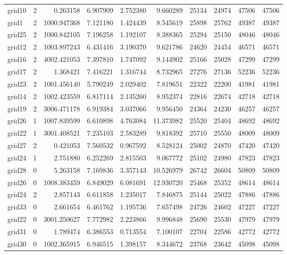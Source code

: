 \begin{longtable}{|l|r|r|r|r|r|r|r|r|r|}
grid10 & 2 & 0.263158 & 6.907909 & 2.752380 & 9.660289 & 25134 & 24974 & 47506 & 47506 \\
grid1 & 2 & 1000.947368 & 7.121180 & 1.424439 & 8.545619 & 25898 & 25762 & 49387 & 49387 \\
grid25 & 2 & 1000.842105 & 7.196258 & 1.192107 & 8.388365 & 25294 & 25150 & 48046 & 48046 \\
grid12 & 2 & 1003.897243 & 6.431416 & 3.190370 & 9.621786 & 24620 & 24454 & 46571 & 46571 \\
grid16 & 2 & 4002.421053 & 7.397810 & 1.747092 & 9.144902 & 25166 & 25028 & 47299 & 47299 \\
grid17 & 2 & 1.368421 & 7.416221 & 1.316744 & 8.732965 & 27276 & 27136 & 52236 & 52236 \\
grid23 & 2 & 1001.456140 & 5.790249 & 2.029402 & 7.819651 & 22322 & 22200 & 41981 & 41981 \\
grid14 & 2 & 1002.423559 & 6.817114 & 2.135260 & 8.952374 & 22816 & 22674 & 42718 & 42718 \\
grid19 & 2 & 3006.471178 & 6.919384 & 3.037066 & 9.956450 & 24364 & 24230 & 46257 & 46257 \\
grid26 & 1 & 1007.839599 & 6.610898 & 4.763084 & 11.373982 & 25520 & 25404 & 48692 & 48692 \\
grid22 & 1 & 3001.408521 & 7.235103 & 2.583289 & 9.818392 & 25710 & 25550 & 48009 & 48009 \\
grid27 & 2 & 0.421053 & 7.560532 & 0.967592 & 8.528124 & 25002 & 24870 & 47420 & 47420 \\
grid24 & 1 & 2.751880 & 6.252269 & 2.815503 & 9.067772 & 25102 & 24980 & 47823 & 47823 \\
grid28 & 0 & 5.263158 & 7.169836 & 3.357143 & 10.526979 & 26742 & 26604 & 50809 & 50809 \\
grid26 & 0 & 1008.383459 & 6.849029 & 6.081691 & 12.930720 & 25468 & 25352 & 48614 & 48614 \\
grid24 & 2 & 2.857143 & 6.611858 & 1.235017 & 7.846875 & 25144 & 25022 & 47886 & 47886 \\
grid33 & 0 & 2.661654 & 6.461762 & 1.195736 & 7.657498 & 24726 & 24602 & 47227 & 47227 \\
grid22 & 0 & 3001.250627 & 7.772982 & 2.223866 & 9.996848 & 25690 & 25530 & 47979 & 47979 \\
grid31 & 0 & 1.789474 & 6.386553 & 0.713554 & 7.100107 & 22704 & 22586 & 42772 & 42772 \\
grid30 & 0 & 1002.365915 & 6.946515 & 1.398157 & 8.344672 & 23768 & 23642 & 45098 & 45098 \\

\end{longtable}

